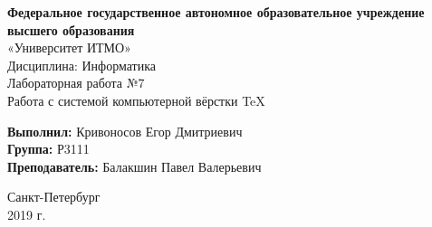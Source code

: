 \begin{center}
    \large
    \Huge \textbf{Федеральное государственное автономное образовательное учреждение высшего образования} \\
    \Huge «Университет ИТМО»\\
    \vspace{2cm}
    Дисциплина: Информатика \\ 
    \vspace{5cm}
    Лабораторная работа №7 \\
    Работа с системой компьютерной вёрстки \TeX \vspace{8cm}
\end{center}
\begin{flushright}
    \LARGE \textbf{Выполнил:} Кривоносов Егор Дмитриевич \\
    \LARGE \textbf{Группа:} Р3111 \\
    \LARGE \textbf{Преподаватель:} Балакшин Павел Валерьевич \\
\end{flushright}
\vfill
\begin{center}
    \LARGE Санкт-Петербург \\ 
    \LARGE 2019 г.
\end{center}